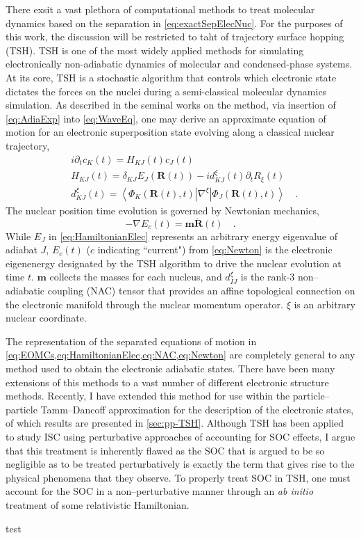 \documentclass[12pt]{article}
\newcommand{\innerop}[3]{\left\langle #1 \left\vert #2 \right\vert #3 \right\rangle}  %
\newcommand*\vc[1]{\boldsymbol{#1}}
\begin{document}
There exsit a vast plethora of computational methods to treat molecular dynamics
based on the separation in \cref{eq:exactSepElecNuc}. For the purposes of this
work, the discussion will be restricted to taht of trajectory surface hopping
(TSH).  TSH is one of the most widely applied methods for simulating
electronically non-adiabatic dynamics of molecular and condensed-phase
systems.\cite{Barbatti11_1759, Tavernelli14_62, Tully12_22A301, Tully98_407,
Hynes14_97} At its core, TSH is a stochastic algorithm that controls which
electronic state dictates the forces on the nuclei during a semi-classical
molecular dynamics simulation.\cite{Preston71_562} As described in the seminal
works on the method\cite{Tully98_407, Tully90_1061}, via insertion of
\cref{eq:AdiaExp} into \cref{eq:WaveEq}, one may derive an approximate equation
of motion for an electronic superposition state evolving along a classical
nuclear trajectory,
\begin{align}
  &i  \partial_t c_K(t) = H_{KJ}(t) c_J(t) \label{eq:EOMCs} \\
  &H_{KJ}(t) = \delta_{KJ}E_J(\vc{R}(t)) - i d_{KJ}^\xi (t) \partial_t R_{\xi}(t) \label{eq:HamiltonianElec} \\
  &d_{KJ}^\xi (t) = \innerop{\Phi_K(\vc{R}(t),t)}{\nabla^\xi}{\Phi_J(\vc{R}(t),t)} \label{eq:NAC}
  \quad .
\end{align}
The nuclear position time evolution is governed by Newtonian mechanics,
\begin{equation}
  -\nabla E_c(t) = \vc{m}\ddot{\vc{R}}(t) \label{eq:Newton}
  \quad.
\end{equation}
While $E_J$ in \cref{eq:HamiltonianElec} represents an arbitrary energy
eigenvalue of adiabat $J$, $E_c(t)$ ($c$ indicating ``current") from
\cref{eq:Newton} is the electronic eigenenergy designated by the TSH algorithm
to drive the nuclear evolution at time $t$.  $\vc{m}$ collects the masses for
each nucleus, and $d_{IJ}^\xi$ is the rank-3 non--adiabatic coupling (NAC)
tensor that provides an affine topological connection on the electronic manifold
through the nuclear momentum operator. $\xi$ is an arbitrary nuclear coordinate.


The representation of the separated equations of motion
in \cref{eq:EOMCs,eq:HamiltonianElec,eq:NAC,eq:Newton} are completely general to
any method used to obtain the electronic adiabatic states. There have been many
extensions of this methods to a vast number of different electronic structure
methods. Recently, I have extended this method for use within the
particle--particle Tamm--Dancoff approximation for the description of the
electronic states\cite{DBWY16_Submitted1}, of which results are presented in
\cref{sec:pp-TSH}. Although TSH has been applied to study ISC using perturbative
approaches of accounting for SOC effects, I argue that this treatment is
inherently flawed as the SOC that is argued to be so negligible as to be treated
perturbatively is exactly the term that gives rise to the physical phenomena
that they observe. To properly treat SOC in TSH, one must account for the SOC in
a non--perturbative manner through an \emph{ab initio} treatment of some
relativistic Hamiltonian.

test\cite{DBWY16_JCTC935}
\linespread{1.0}

\end{document}
